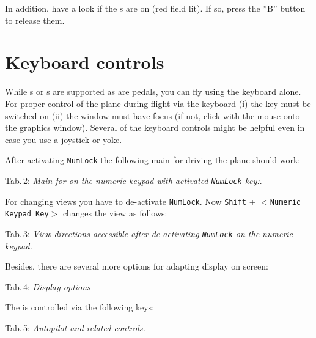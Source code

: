 In addition, have a look if the s are on (red field lit). If so, press the ''B'' button to release them.

\section{Keyboard controls}

While s or s are supported as are  pedals, you
can fly \FlightGear{} using the keyboard alone. For proper control of the plane during
flight via the keyboard (i) the \texttt{} key must be switched on (ii) the
\FlightGear{} window must have focus (if not, click with the mouse onto the graphics
window). Several of the keyboard controls might be helpful even in case you use a
joystick or yoke.

After activating \texttt{NumLock} the following main  for driving the plane should work:
 \eject

\noindent
 Tab.\,2: \textit{Main  for \FlightGear{} on the numeric keypad with
 activated \texttt{NumLock} key:}.
\medskip

\centerline{}
\vskip5mm

For changing views you have to de-activate \texttt{NumLock}. Now \texttt{Shift} +
$<$\texttt{Numeric Keypad Key}$>$ changes the view as follows:
\medskip

\noindent
 Tab.\,3: \textit{View directions
accessible after de-activating \texttt{NumLock} on the numeric keypad.}
\medskip

\centerline{}
\vskip5mm

Besides, there are several more options for adapting display on screen:
\vfill
\eject

\noindent
 Tab.\,4: \textit{Display options}
\medskip

\centerline{}
\vskip5mm

The  is controlled via the following keys:
\medskip

\noindent
 Tab.\,5: \textit{Autopilot and related controls.}
\medskip

\centerline{}
\medskip


